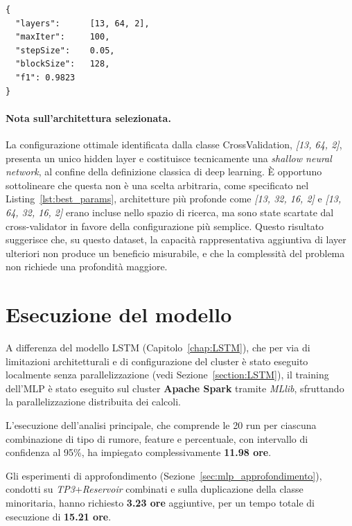 \documentclass[../main.tex]{subfiles}
\begin{document}
\begin{lstlisting}[language=xml, caption={Iperparametri ottimali selezionati dal CrossValidator e f1-score della configurazione}, label={lst:best_params}]
{
  "layers":      [13, 64, 2],
  "maxIter":     100,
  "stepSize":    0.05,
  "blockSize":   128,
  "f1": 0.9823
}
\end{lstlisting}

\paragraph{Nota sull'architettura selezionata.}
La configurazione ottimale identificata dalla classe CrossValidation, \textit{[13, 64, 2]}, presenta un unico hidden layer e costituisce tecnicamente una \textit{shallow neural
network}, al confine della definizione classica di deep learning. È opportuno sottolineare che questa non è una scelta arbitraria, come specificato nel Listing~\ref{lst:best_params}, architetture più profonde come \textit{[13, 32, 16, 2]} e \textit{[13, 64, 32, 16, 2]} erano incluse nello spazio di ricerca, ma sono state scartate dal cross-validator in favore della configurazione più semplice. Questo risultato suggerisce che, su questo dataset, la capacità rappresentativa aggiuntiva di layer ulteriori non produce un beneficio misurabile, e che la complessità del problema non richiede una profondità maggiore.


\section{Esecuzione del modello}
\label{section:MLPEsecuzione}

A differenza del modello LSTM (Capitolo~\ref{chap:LSTM}), che per via di limitazioni architetturali e di configurazione del cluster è stato eseguito localmente senza parallelizzazione (vedi Sezione~\ref{section:LSTM}), il training dell'MLP è stato eseguito sul cluster \textbf{Apache Spark} tramite \textit{MLlib}, sfruttando la parallelizzazione distribuita dei calcoli.

L'esecuzione dell'analisi principale, che comprende le 20 run per ciascuna
combinazione di tipo di rumore, feature e percentuale, con intervallo di confidenza
al 95\%, ha impiegato complessivamente \textbf{11.98 ore}.

Gli esperimenti di approfondimento (Sezione~\ref{sec:mlp_approfondimento}), condotti su \textit{TP3}+\textit{Reservoir} combinati e sulla duplicazione della classe minoritaria, hanno richiesto \textbf{3.23 ore} aggiuntive, per un tempo totale di esecuzione di \textbf{15.21 ore}.
\end{document}
